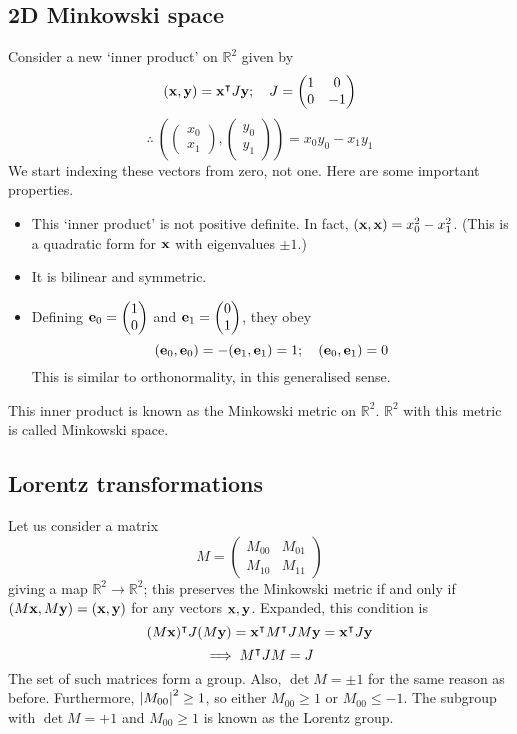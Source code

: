 \subsection{2D Minkowski space}
Consider a new `inner product' on \(\mathbb R^2\) given by
\[
	(\vb x, \vb y) = \vb x^\intercal J \vb y;\quad J = \begin{pmatrix}
		1 & 0 \\ 0 & -1
	\end{pmatrix}
\]
\[
	\therefore\ \left( \begin{pmatrix}
			x_0 \\ x_1
		\end{pmatrix}, \begin{pmatrix}
			y_0 \\ y_1
		\end{pmatrix} \right) = x_0 y_0 - x_1 y_1
\]
We start indexing these vectors from zero, not one.
Here are some important properties.
\begin{itemize}
	\item This `inner product' is not positive definite.
	      In fact, \((\vb x, \vb x) = x_0^2 - x_1^2\).
	      (This is a  quadratic form for \(\vb x\) with eigenvalues \(\pm 1\).)
	\item It is bilinear and symmetric.
	\item Defining \(\vb e_0 = \begin{pmatrix}
		      1 \\ 0
	      \end{pmatrix}\) and \(\vb e_1 = \begin{pmatrix}
		      0 \\ 1
	      \end{pmatrix}\), they obey
	      \[
		      (\vb e_0, \vb e_0) = -(\vb e_1, \vb e_1) = 1;\quad (\vb e_0, \vb e_1) = 0
	      \]
	      This is similar to orthonormality, in this generalised sense.
\end{itemize}
This inner product is known as the Minkowski metric on \(\mathbb R^2\).
\(\mathbb R^2\) with this metric is called Minkowski space.

\subsection{Lorentz transformations}
Let us consider a matrix
\[
	M = \begin{pmatrix}
		M_{00} & M_{01} \\
		M_{10} & M_{11}
	\end{pmatrix}
\]
giving a map \(\mathbb R^2 \to \mathbb R^2\); this preserves the Minkowski metric if and only if \((M\vb x, M\vb y) = (\vb x, \vb y)\) for any vectors \(\vb x, \vb y\).
Expanded, this condition is
\[
	(M\vb x)^\intercal J(M \vb y) = \vb x^\intercal M^\intercal J M \vb y = \vb x^\intercal J \vb y
\]
\[
	\implies M^\intercal J M = J
\]
The set of such matrices form a group.
Also, \(\det M = \pm 1\) for the same reason as before.
Furthermore, \(\abs{M_{00}}^2 \geq 1\), so either \(M_{00} \geq 1\) or \(M_{00} \leq -1\).
The subgroup with \(\det M = +1\) and \(M_{00} \geq 1\) is known as the Lorentz group.

